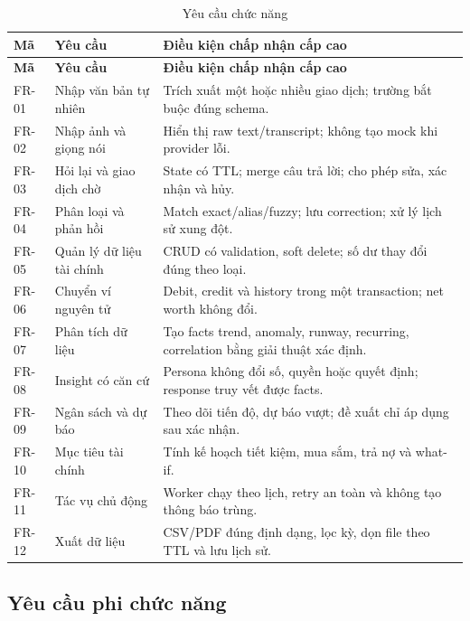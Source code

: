 \begin{longtable}{@{}L{1.3cm}L{4.3cm}L{8.2cm}@{}}
  \caption{Yêu cầu chức năng}\label{tab:functional-requirements}\\
  \toprule
  \textbf{Mã} & \textbf{Yêu cầu} & \textbf{Điều kiện chấp nhận cấp cao} \\
  \midrule
  \endfirsthead
  \toprule
  \textbf{Mã} & \textbf{Yêu cầu} & \textbf{Điều kiện chấp nhận cấp cao} \\
  \midrule
  \endhead
  FR-01 & Nhập văn bản tự nhiên & Trích xuất một hoặc nhiều giao dịch; trường bắt buộc đúng schema. \\
  FR-02 & Nhập ảnh và giọng nói & Hiển thị raw text/transcript; không tạo mock khi provider lỗi. \\
  FR-03 & Hỏi lại và giao dịch chờ & State có TTL; merge câu trả lời; cho phép sửa, xác nhận và hủy. \\
  FR-04 & Phân loại và phản hồi & Match exact/alias/fuzzy; lưu correction; xử lý lịch sử xung đột. \\
  FR-05 & Quản lý dữ liệu tài chính & CRUD có validation, soft delete; số dư thay đổi đúng theo loại. \\
  FR-06 & Chuyển ví nguyên tử & Debit, credit và history trong một transaction; net worth không đổi. \\
  FR-07 & Phân tích dữ liệu & Tạo facts trend, anomaly, runway, recurring, correlation bằng giải thuật xác định. \\
  FR-08 & Insight có căn cứ & Persona không đổi số, quyền hoặc quyết định; response truy vết được facts. \\
  FR-09 & Ngân sách và dự báo & Theo dõi tiến độ, dự báo vượt; đề xuất chỉ áp dụng sau xác nhận. \\
  FR-10 & Mục tiêu tài chính & Tính kế hoạch tiết kiệm, mua sắm, trả nợ và what-if. \\
  FR-11 & Tác vụ chủ động & Worker chạy theo lịch, retry an toàn và không tạo thông báo trùng. \\
  FR-12 & Xuất dữ liệu & CSV/PDF đúng định dạng, lọc kỳ, dọn file theo TTL và lưu lịch sử. \\
  \bottomrule
\end{longtable}

\subsection{Yêu cầu phi chức năng}

